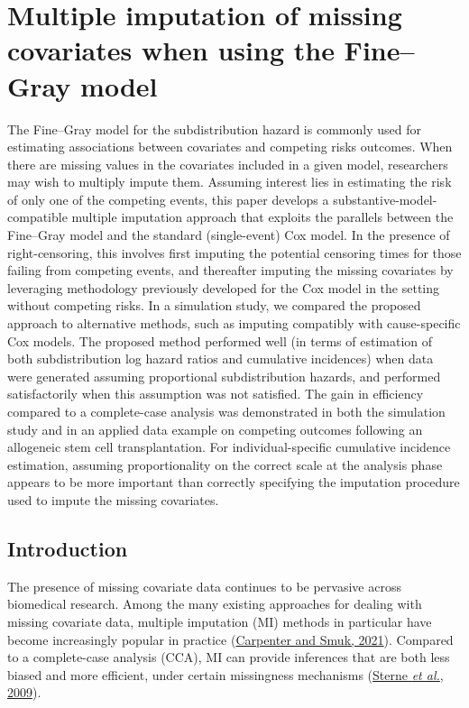 \documentclass[
  letterpaper,
  DIV=11,
  numbers=noendperiod]{scrreprt}
\begin{document}

\hypertarget{multiple-imputation-of-missing-covariates-when-using-the-finegray-model}{%
\chapter{Multiple imputation of missing covariates when using the
Fine--Gray
model}\label{multiple-imputation-of-missing-covariates-when-using-the-finegray-model}}

The Fine--Gray model for the subdistribution hazard is commonly used for
estimating associations between covariates and competing risks outcomes.
When there are missing values in the covariates included in a given
model, researchers may wish to multiply impute them. Assuming interest
lies in estimating the risk of only one of the competing events, this
paper develops a substantive-model-compatible multiple imputation
approach that exploits the parallels between the Fine--Gray model and
the standard (single-event) Cox model. In the presence of
right-censoring, this involves first imputing the potential censoring
times for those failing from competing events, and thereafter imputing
the missing covariates by leveraging methodology previously developed
for the Cox model in the setting without competing risks. In a
simulation study, we compared the proposed approach to alternative
methods, such as imputing compatibly with cause-specific Cox models. The
proposed method performed well (in terms of estimation of both
subdistribution log hazard ratios and cumulative incidences) when data
were generated assuming proportional subdistribution hazards, and
performed satisfactorily when this assumption was not satisfied. The
gain in efficiency compared to a complete-case analysis was demonstrated
in both the simulation study and in an applied data example on competing
outcomes following an allogeneic stem cell transplantation. For
individual-specific cumulative incidence estimation, assuming
proportionality on the correct scale at the analysis phase appears to be
more important than correctly specifying the imputation procedure used
to impute the missing covariates.

\hfill\break

\hypertarget{introduction-2}{%
\section{Introduction}\label{introduction-2}}

The presence of missing covariate data continues to be pervasive across
biomedical research. Among the many existing approaches for dealing with
missing covariate data, multiple imputation (MI) methods in particular
have become increasingly popular in practice
(\protect\hyperlink{ref-carpenterMissingDataStatistical2021}{Carpenter
and Smuk, 2021}). Compared to a complete-case analysis (CCA), MI can
provide inferences that are both less biased and more efficient, under
certain missingness mechanisms
(\protect\hyperlink{ref-sterneMultipleImputationMissing2009}{Sterne
\emph{et al.}, 2009}).
\end{document}

